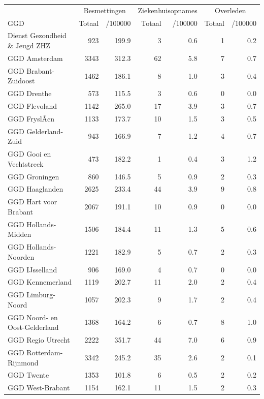 \documentclass[
  english,
  man,floatsintext]{apa6}
\begin{document}
\begin{table}
\centering\begingroup\fontsize{10}{12}\selectfont

\begin{threeparttable}
\begin{tabular}{lrrrrrr}
\toprule
\multicolumn{1}{c}{ } & \multicolumn{2}{c}{Besmettingen} & \multicolumn{2}{c}{Ziekenhuisopnames} & \multicolumn{2}{c}{Overleden} \\
\cmidrule(l{3pt}r{3pt}){2-3} \cmidrule(l{3pt}r{3pt}){4-5} \cmidrule(l{3pt}r{3pt}){6-7}
GGD & Totaal & /100000 & Totaal & /100000 & Totaal & /100000\\
\midrule
Dienst Gezondheid \& Jeugd ZHZ & 923 & 199.9 & 3 & 0.6 & 1 & 0.2\\
GGD Amsterdam & 3343 & 312.3 & 62 & 5.8 & 7 & 0.7\\
GGD Brabant-Zuidoost & 1462 & 186.1 & 8 & 1.0 & 3 & 0.4\\
GGD Drenthe & 573 & 115.5 & 3 & 0.6 & 0 & 0.0\\
GGD Flevoland & 1142 & 265.0 & 17 & 3.9 & 3 & 0.7\\
GGD FryslÃ¢n & 1133 & 173.7 & 10 & 1.5 & 3 & 0.5\\
GGD Gelderland-Zuid & 943 & 166.9 & 7 & 1.2 & 4 & 0.7\\
GGD Gooi en Vechtstreek & 473 & 182.2 & 1 & 0.4 & 3 & 1.2\\
GGD Groningen & 860 & 146.5 & 5 & 0.9 & 2 & 0.3\\
GGD Haaglanden & 2625 & 233.4 & 44 & 3.9 & 9 & 0.8\\
GGD Hart voor Brabant & 2067 & 191.1 & 10 & 0.9 & 0 & 0.0\\
GGD Hollands-Midden & 1506 & 184.4 & 11 & 1.3 & 5 & 0.6\\
GGD Hollands-Noorden & 1221 & 182.9 & 5 & 0.7 & 2 & 0.3\\
GGD IJsselland & 906 & 169.0 & 4 & 0.7 & 0 & 0.0\\
GGD Kennemerland & 1119 & 202.7 & 11 & 2.0 & 2 & 0.4\\
GGD Limburg-Noord & 1057 & 202.3 & 9 & 1.7 & 2 & 0.4\\
GGD Noord- en Oost-Gelderland & 1368 & 164.2 & 6 & 0.7 & 8 & 1.0\\
GGD Regio Utrecht & 2222 & 351.7 & 44 & 7.0 & 6 & 0.9\\
GGD Rotterdam-Rijnmond & 3342 & 245.2 & 35 & 2.6 & 2 & 0.1\\
GGD Twente & 1353 & 101.8 & 6 & 0.5 & 2 & 0.2\\
GGD West-Brabant & 1154 & 162.1 & 11 & 1.5 & 2 & 0.3\\

\end{tabular}
\end{threeparttable}
\end{table}
\end{document}
